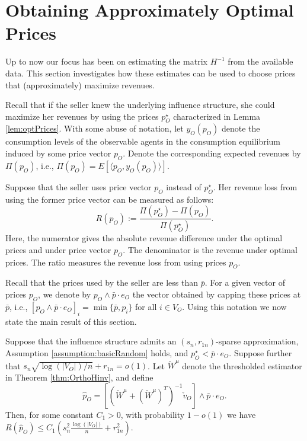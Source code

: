 \documentclass[opre,nonblindrev]{informs3} %
\begin{document}
\section{Obtaining Approximately Optimal Prices} \label{subse:estimationPrices}

Up to now our focus has been on estimating the
matrix $H^{-1}$  from the available data. This section  investigates how these estimates can be used to choose prices that (approximately) maximize revenues.


Recall that if the seller knew the underlying influence structure,
she could maximize her revenues by using the prices ${p}_O^\star$ characterized in Lemma \ref{lem:optPrices}.
With some abuse of notation, let
${y}_O({{p}}_O)$ denote the
consumption  levels of the observable agents in the  consumption equilibrium induced by some price vector ${{p}}_O$.
Denote the corresponding expected revenues
by $\Pi({{p}}_O)$, i.e.,
$\Pi({{p}}_O)={E}[\langle {{p}}_O,
	{y}_O({{p}}_O) \rangle]$.

Suppose that the seller uses  price vector ${{p}}_O$ instead of ${p}_O^\star$.
Her revenue loss from using the former price vector can be measured as follows:
\begin{equation}\label{eq:profitLoss}
R({{p}}_O) := \frac{\Pi({{p}}^\star_O) -\Pi({{p}}_O)}{\Pi({{p}}_O^\star)}.
\end{equation}
Here, the numerator gives the absolute revenue difference under the optimal prices and under price vector ${{p}}_O$.
The denominator is the revenue under optimal prices. The ratio measures the revenue loss from using prices ${{p}}_O$.


Recall that the prices used by the seller are less than $\bar p$.
For a given vector of prices ${ p}_O$, we denote by
${ p}_O \wedge {\bar{p}} \cdot {e}_O$
the vector obtained by capping these prices at $\bar p$, i.e.,
$[{ p}_O \wedge {\bar{p}} \cdot {e}_O]_i = \min\{\bar{p}, p_i\}$ for all $i\in V_O$.
Using this notation we now state
the main result of this section.


\begin{theorem}\label{thm:optimalprices}
	Suppose that the influence structure admits an $(s_n,r_{1n})$-sparse approximation,  Assumption \ref{assumption:basicRandom} holds, and
	${p}_O^\star < \bar p \cdot {e}_O$.
	Suppose further that
	$s_n \sqrt{\log(|V_O|)/n} +  r_{1n} = o(1)$.
	Let $\check{W}^\mu$ denote the thresholded estimator in Theorem \ref{thm:OrthoHinv}, and define 
	\begin{equation} \label{eq:priceThm3}
	\hat {{p}}_O = [( \check{W}^\mu +  (\check{W}^\mu)^T)^{-1}
	\check{{v}}_O]\wedge \bar{p} \cdot {e}_O.
	\end{equation}
	Then,
	for some constant $C_1>0$, 
	with probability
	$1-o(1)$ we have
			$R(\hat{{p}}_O)\leq
	C_1 \left(
	s_n^2  \frac{\log(|V_O|)}{n} +  r_{1n}^2 \right)$.	
	

\end{theorem}
\end{document}
